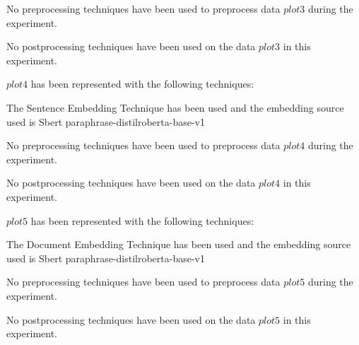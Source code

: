 \documentclass[11pt]{article}
\begin{document}
No preprocessing techniques have been used to preprocess data $ plot3 $ during the experiment.
\hfill\break
\hfill\break



No postprocessing techniques have been used on the data $ plot3 $ in this experiment.
\hfill\break
\hfill\break



$ plot4 $  has been represented with the following techniques:
\hfill\break
\hfill\break



The Sentence Embedding Technique has been used and
the embedding source used is
Sbert paraphrase-distilroberta-base-v1
\hfill\break
\hfill\break



No preprocessing techniques have been used to preprocess data $ plot4 $ during the experiment.
\hfill\break
\hfill\break



No postprocessing techniques have been used on the data $ plot4 $ in this experiment.
\hfill\break
\hfill\break



$ plot5 $  has been represented with the following techniques:
\hfill\break
\hfill\break



The Document Embedding Technique has been used and
the embedding source used is
Sbert paraphrase-distilroberta-base-v1
\hfill\break
\hfill\break



No preprocessing techniques have been used to preprocess data $ plot5 $ during the experiment.
\hfill\break
\hfill\break



No postprocessing techniques have been used on the data $ plot5 $ in this experiment.
\hfill\break
\hfill\break
\end{document}
